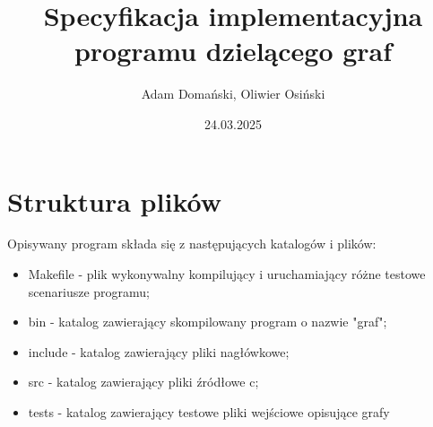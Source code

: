 \documentclass{article}
\title{\textbf{Specyfikacja implementacyjna programu dzielącego graf}}
\author{Adam Domański, Oliwier Osiński}
\date{24.03.2025}
\begin{document}
\maketitle

\section*{Struktura plików}
Opisywany program składa się z następujących katalogów i plików:
\begin{itemize}
    \item Makefile - plik wykonywalny kompilujący i uruchamiający różne testowe scenariusze programu;
    \item bin - katalog zawierający skompilowany program o nazwie "graf";
    \item include - katalog zawierający pliki nagłówkowe;
    \item src - katalog zawierający pliki źródłowe c;
    \item tests - katalog zawierający testowe pliki wejściowe opisujące grafy
\end{itemize}
\end{document}
